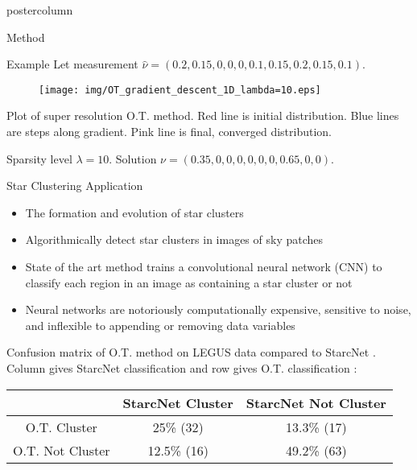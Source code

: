 \documentclass{beamer}
\begin{document}
\begin{frame}
\begin{columns}
\begin{column}{.5\textwidth}
\begin{beamercolorbox}[center]{postercolumn}
\begin{minipage}{.98\textwidth}
{\begin{myblock}{Method}
\begin{algorithm}[H]
{        
  	}
	\caption{ O.T. Super Resolution Clustering \cite{rawson_astro}}
\end{algorithm}

					\end{myblock}\vfill

					\begin{myblock}{Example}
                        Let measurement $ \hat\nu = (0.2, 0.15, 0, 0, 0, 0.1, 0.15, 0.2, 0.15, 0.1) $. 
                        \begin{figure}
                        \centering
        \texttt{[image: img/OT\_gradient\_descent\_1D\_lambda=10.eps]}
                        \end{figure}
                        
                        Plot of super resolution O.T. method. Red line is initial distribution. Blue lines are steps along gradient. Pink line is final, converged distribution.

                        Sparsity level $\lambda=10$. Solution $ \nu = (0.35,0,0,0,0,0,0,0.65,0,0)$. 

					\end{myblock}\vfill
     \begin{myblock}{Star Clustering Application}
\begin{itemize}
    \item The formation and evolution of star clusters\cite{perez}
    \item Algorithmically detect star clusters in images of sky patches
    \item State of the art method trains a convolutional neural network (CNN) to classify each region in an image as containing a star cluster or not \cite{perez}
    \item Neural networks are notoriously computationally expensive, sensitive to noise, and inflexible to appending or removing data variables
\end{itemize}

Confusion matrix of O.T. method on LEGUS data compared to StarcNet \cite{perez}. Column gives StarcNet classification and row gives O.T. classification \cite{rawson_astro}:

\begin{table}
\begin{center}
\begin{tabular}{c|c|c|}
 & StarcNet Cluster & StarcNet Not Cluster \\
\hline
O.T. Cluster     & 25\% (32) & 13.3\% (17)  \\
\hline
O.T. Not Cluster & 12.5\% (16) & 49.2\% (63)  \\
\hline
\end{tabular}
\label{table:2}
\end{center}
\end{table}


\end{myblock}}
\end{minipage}
\end{beamercolorbox}
\end{column}
\end{columns}
\end{frame}
\end{document}
